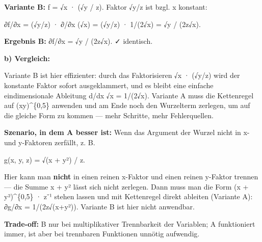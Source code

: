 \documentclass[11pt, a4paper]{article}
\begin{document}
\textbf{Variante B:} f = √x · (√y / z). Faktor √y/z ist bzgl. x konstant:


∂f/∂x = (√y/z) · ∂/∂x (√x) = (√y/z) · 1/(2√x) = √y / (2z√x).


\textbf{Ergebnis B:} ∂f/∂x = √y / (2z√x). ✓ identisch.


\textbf{b) Vergleich:}


Variante B ist hier effizienter: durch das Faktorisieren √x · (√y/z) wird der konstante Faktor sofort ausgeklammert, und es bleibt eine einfache eindimensionale Ableitung d/dx √x = 1/(2√x). Variante A muss die Kettenregel auf (xy)\textasciicircum{}\{0,5\} anwenden und am Ende noch den Wurzelterm zerlegen, um auf die gleiche Form zu kommen — mehr Schritte, mehr Fehlerquellen.


\textbf{Szenario, in dem A besser ist:} Wenn das Argument der Wurzel nicht in x- und y-Faktoren zerfällt, z. B.


g(x, y, z) = √(x + y²) / z.


Hier kann man \textbf{nicht} in einen reinen x-Faktor und einen reinen y-Faktor trennen — die Summe x + y² lässt sich nicht zerlegen. Dann muss man die Form (x + y²)\textasciicircum{}\{0,5\} · z⁻¹ stehen lassen und mit Kettenregel direkt ableiten (Variante A): ∂g/∂x = 1/(2z√(x+y²)). Variante B ist hier nicht anwendbar.


\textbf{Trade-off:} B nur bei multiplikativer Trennbarkeit der Variablen; A funktioniert immer, ist aber bei trennbaren Funktionen unnötig aufwendig.





\end{document}
